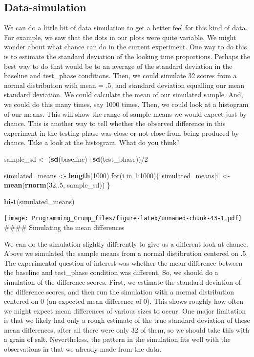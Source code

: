 \documentclass[]{book}
\newenvironment{Shaded}{\begin{snugshade}}{\end{snugshade}}
\newcommand{\KeywordTok}[1]{\textcolor[rgb]{0.13,0.29,0.53}{\textbf{{#1}}}}
\newcommand{\DecValTok}[1]{\textcolor[rgb]{0.00,0.00,0.81}{{#1}}}
\newcommand{\StringTok}[1]{\textcolor[rgb]{0.31,0.60,0.02}{{#1}}}
\newcommand{\NormalTok}[1]{{#1}}
\theoremstyle{definition}
\theoremstyle{definition}
\theoremstyle{definition}
\theoremstyle{remark}
\begin{document}
\subsection{Data-simulation}\label{data-simulation}

We can do a little bit of data simulation to get a better feel for this
kind of data. For example, we saw that the dots in our plots were quite
variable. We might wonder about what chance can do in the current
experiment. One way to do this is to estimate the standard deviation of
the looking time proportions. Perhaps the best way to do that would be
to an average of the standard deviation in the baseline and test\_phase
conditions. Then, we could simulate 32 scores from a normal distribution
with mean = .5, and standard deviation equalling our mean standard
deviation. We could calculate the mean of our simulated sample. And, we
could do this many times, say 1000 times. Then, we could look at a
histogram of our means. This will show the range of sample means we
would expect just by chance. This is another way to tell whether the
observed difference in this experiment in the testing phase was close or
not close from being produced by chance. Take a look at the histogram.
What do you think?

\begin{Shaded}
\begin{Highlighting}[]
\NormalTok{sample_sd   <-}\StringTok{ }\NormalTok{(}\KeywordTok{sd}\NormalTok{(baseline)+}\KeywordTok{sd}\NormalTok{(test_phase))/}\DecValTok{2}

\NormalTok{simulated_means <-}\StringTok{ }\KeywordTok{length}\NormalTok{(}\DecValTok{1000}\NormalTok{)}
\NormalTok{for(i in }\DecValTok{1}\NormalTok{:}\DecValTok{1000}\NormalTok{)\{}
 \NormalTok{simulated_means[i] <-}\StringTok{ }\KeywordTok{mean}\NormalTok{(}\KeywordTok{rnorm}\NormalTok{(}\DecValTok{32}\NormalTok{,.}\DecValTok{5}\NormalTok{, sample_sd))}
\NormalTok{\}}

\KeywordTok{hist}\NormalTok{(simulated_means)}
\end{Highlighting}
\end{Shaded}

\texttt{[image: Programming\_Crump\_files/figure-latex/unnamed-chunk-43-1.pdf]}
\#\#\#\# Simulating the mean differences

We can do the simulation slightly differently to give us a different
look at chance. Above we simulated the sample means from a normal
distibrution centered on .5. The experimental question of interest was
whether the mean difference between the baseline and test\_phase
condition was different. So, we should do a simulation of the difference
scores. First, we estimate the standard deviation of the difference
scores, and then run the simulation with a normal distribution centered
on 0 (an expected mean difference of 0). This shows roughly how often we
might expect mean differences of various sizes to occur. One major
limitation is that we likely had only a rough estimate of the true
standard deviation of these mean differences, after all there were only
32 of them, so we should take this with a grain of salt. Nevertheless,
the pattern in the simulation fits well with the observations in that we
already made from the data.
\end{document}
